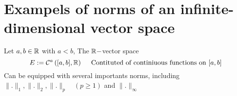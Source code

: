 \section{Exampels of norms of an infinite-dimensional
vector space}
Let $a,b \in \mathbb{R} $ with $a < b$, The $\mathbb{R}-$vector space
\[
E := \mathcal{C} ^{a}
\left( 
	[a,b] , \mathbb{R} 
\right) \quad 
\text{ Contituted of continiuous functions on $[a,b] $ } 
\]
Can be equipped with several importants norms, including
$\| . \| _{1}, 
\| . \| _{2}, \| . \| _{p} \quad 
\left( p \geq 1 \right)$  and 
$\| . \| _{\infty }$ 
% 
